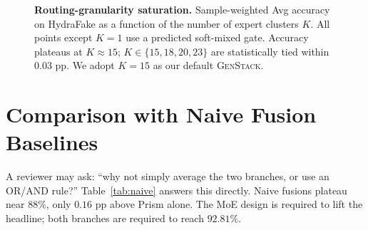 \documentclass[10pt,twocolumn,letterpaper]{article}
\begin{document}
\begin{figure}[t]
\centering
{}
\caption{\textbf{Routing-granularity saturation.} Sample-weighted Avg accuracy on HydraFake as a function of the number of expert clusters $K$. All points except $K{=}1$ use a predicted soft-mixed gate. Accuracy plateaus at $K\!\approx\!15$; $K\!\in\!\{15,18,20,23\}$ are statistically tied within $0.03$ pp. We adopt $K{=}15$ as our default \textsc{GenStack}.}
\label{fig:K_curve}
\end{figure}

\section{Comparison with Naive Fusion Baselines}
\label{sec:naive_baselines}

A reviewer may ask: ``why not simply average the two branches, or use an OR/AND rule?'' Table~\ref{tab:naive} answers this directly. Naive fusions plateau near $88\%$, only $0.16$ pp above Prism alone. The MoE design is required to lift the headline; both branches are required to reach $92.81\%$.
\end{document}
